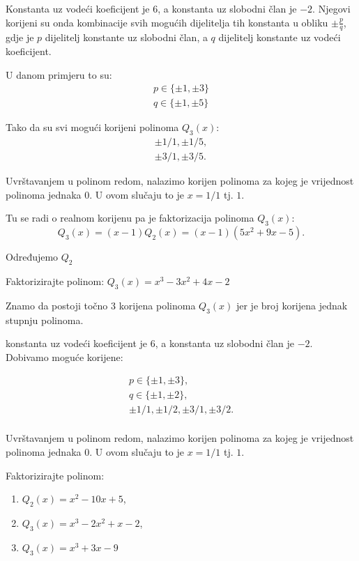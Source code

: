 Konstanta uz vodeći koeficijent je $6$, a konstanta uz slobodni član je $-2$.
Njegovi korijeni su onda kombinacije svih mogućih dijelitelja tih konstanta u
obliku $\pm\frac{p}{q}$, gdje je $p$ dijelitelj konstante uz slobodni član, a
$q$ dijelitelj konstante uz vodeći koeficijent.

U danom primjeru to su:
\begin{gather*}
p\in\{\pm1, \pm3\}\\
q\in\{\pm1, \pm5\}
\end{gather*}

Tako da su svi mogući korijeni polinoma $Q_3(x)$:
\begin{gather*}
\pm 1/1, \pm 1/5,\\
\pm 3/1, \pm 3/5.
\end{gather*}

Uvrštavanjem u polinom redom, nalazimo korijen polinoma za kojeg je vrijednost
polinoma jednaka $0$. U ovom slučaju to je $x=1/1$ tj. $1$.

Tu se radi o realnom korijenu pa je faktorizacija polinoma $Q_3(x)$:
$$
Q_3(x) = (x-1)Q_2(x) = (x-1)(5x^2+9x-5).
$$

Određujemo $Q_2$

\begin{example}
    Faktorizirajte polinom: $Q_3(x) = x^3-3x^2+4x-2$
\end{example}

Znamo da postoji točno $3$ korijena polinoma $Q_3(x)$ jer je broj korijena
jednak stupnju polinoma.


konstanta uz vodeći koeficijent je 6,
a konstanta uz slobodni član je $-2$. Dobivamo moguće korijene:

\begin{gather*}
p\in\{\pm1, \pm3\},\\
q\in\{\pm1, \pm2\},\\
\pm 1/1, \pm 1/2, \pm 3/1, \pm 3/2.\\
\end{gather*}

Uvrštavanjem u polinom redom, nalazimo korijen polinoma za kojeg je vrijednost
polinoma jednaka $0$. U ovom slučaju to je $x=1/1$ tj. $1$.


\begin{example}
    Faktorizirajte polinom:
    \begin{enumerate}
        \item $Q_2(x) = x^2-10x+5$,
        \item $Q_3(x) = x^3-2x^2+x-2$,
        \item $Q_3(x) = x^3+3x-9$
    \end{enumerate}
\end{example}
